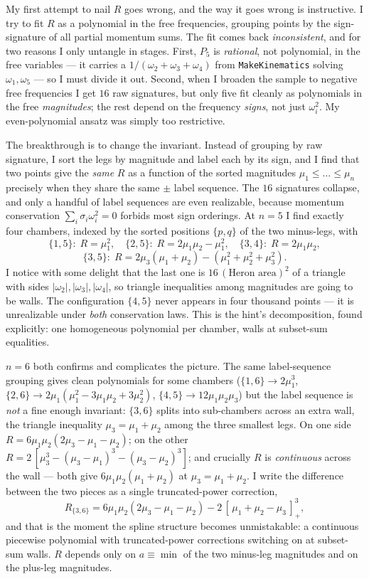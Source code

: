 \documentclass{article}
\newcommand{\pp}[1]{\left[\,#1\,\right]_{+}}
\begin{document}
My first attempt to nail $R$ goes wrong, and the way it goes wrong is
instructive. I try to fit $R$ as a polynomial in the free frequencies, grouping
points by the sign-signature of all partial momentum sums. The fit comes back
\emph{inconsistent}, and for two reasons I only untangle in stages. First, $P_5$
is \emph{rational}, not polynomial, in the free variables --- it carries a
$1/(\omega_2{+}\omega_3{+}\omega_4)$ from \texttt{MakeKinematics} solving
$\omega_1,\omega_5$ --- so I must divide it out. Second, when I broaden the
sample to negative free frequencies I get $16$ raw signatures, but only five fit
cleanly as polynomials in the free \emph{magnitudes}; the rest depend on the
frequency \emph{signs}, not just $\omega_i^2$. My even-polynomial ansatz was
simply too restrictive.

The breakthrough is to change the invariant. Instead of grouping by raw
signature, I sort the legs by magnitude and label each by its sign, and I find
that two points give the \emph{same} $R$ as a function of the sorted magnitudes
$\mu_1\le\dots\le\mu_n$ precisely when they share the same $\pm$ label sequence.
The $16$ signatures collapse, and only a handful of label sequences are even
realizable, because momentum conservation $\sum_i\sigma_i\omega_i^2=0$ forbids
most sign orderings. At $n=5$ I find exactly four chambers, indexed by the sorted
positions $\{p,q\}$ of the two minus-legs, with
\[
\{1,5\}:\;R=\mu_1^2,\quad
\{2,5\}:\;R=2\mu_1\mu_2-\mu_1^2,\quad
\{3,4\}:\;R=2\mu_1\mu_2,
\]
\[
\{3,5\}:\;R=2\mu_3(\mu_1+\mu_2)-(\mu_1^2+\mu_2^2+\mu_3^2).
\]
I notice with some delight that the last one is
$16\,(\text{Heron area})^2$ of a triangle with sides $|\omega_2|,|\omega_3|,
|\omega_4|$, so triangle inequalities among magnitudes are going to be walls. The
configuration $\{4,5\}$ never appears in four thousand points --- it is
unrealizable under \emph{both} conservation laws. This is the hint's
decomposition, found explicitly: one homogeneous polynomial per chamber, walls at
subset-sum equalities.

$n=6$ both confirms and complicates the picture. The same label-sequence grouping
gives clean polynomials for some chambers ($\{1,6\}\to2\mu_1^3$,
$\{2,6\}\to2\mu_1(\mu_1^2-3\mu_1\mu_2+3\mu_2^2)$, $\{4,5\}\to12\mu_1\mu_2\mu_3$)
but the label sequence is \emph{not} a fine enough invariant: $\{3,6\}$ splits
into sub-chambers across an extra wall, the triangle inequality
$\mu_3=\mu_1+\mu_2$ among the three smallest legs. On one side
$R=6\mu_1\mu_2(2\mu_3-\mu_1-\mu_2)$; on the other
$R=2\,[\mu_3^3-(\mu_3-\mu_1)^3-(\mu_3-\mu_2)^3]$; and crucially $R$ is
\emph{continuous} across the wall --- both give $6\mu_1\mu_2(\mu_1+\mu_2)$ at
$\mu_3=\mu_1+\mu_2$. I write the difference between the two pieces as a single
truncated-power correction,
\[
R_{\{3,6\}}=6\mu_1\mu_2(2\mu_3-\mu_1-\mu_2)-2\,\pp{\mu_1+\mu_2-\mu_3}^{3},
\]
and that is the moment the spline structure becomes unmistakable: a continuous
piecewise polynomial with truncated-power corrections switching on at subset-sum
walls. $R$ depends only on $a\equiv\min$ of the two minus-leg magnitudes and on
the plus-leg magnitudes.
\end{document}
